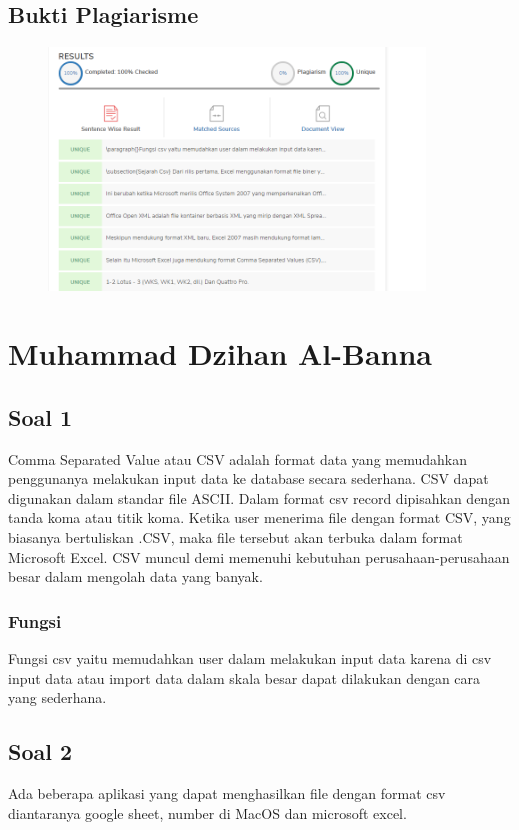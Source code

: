 \subsection{Bukti Plagiarisme}
\begin{figure}[h]
	\includegraphics[width=10cm]{figures/4/1174051/teori/nih.png}
	\centering
\end{figure}
\section{Muhammad Dzihan Al-Banna}
\subsection{Soal 1}
Comma Separated Value atau CSV adalah format data yang memudahkan penggunanya melakukan input data ke database secara sederhana. CSV dapat digunakan dalam standar file ASCII. Dalam format csv record dipisahkan dengan tanda koma atau titik koma. Ketika user menerima file dengan format CSV, yang biasanya bertuliskan .CSV, maka file tersebut akan terbuka dalam format Microsoft Excel. CSV muncul demi memenuhi kebutuhan perusahaan-perusahaan besar dalam mengolah data yang banyak.

\subsubsection{Fungsi}
Fungsi csv yaitu memudahkan user dalam melakukan input data karena di csv input data atau import data dalam skala besar dapat dilakukan dengan cara yang sederhana.
\subsection{Soal 2}
Ada beberapa aplikasi yang dapat menghasilkan file dengan format csv diantaranya google sheet, number di MacOS dan microsoft excel.
